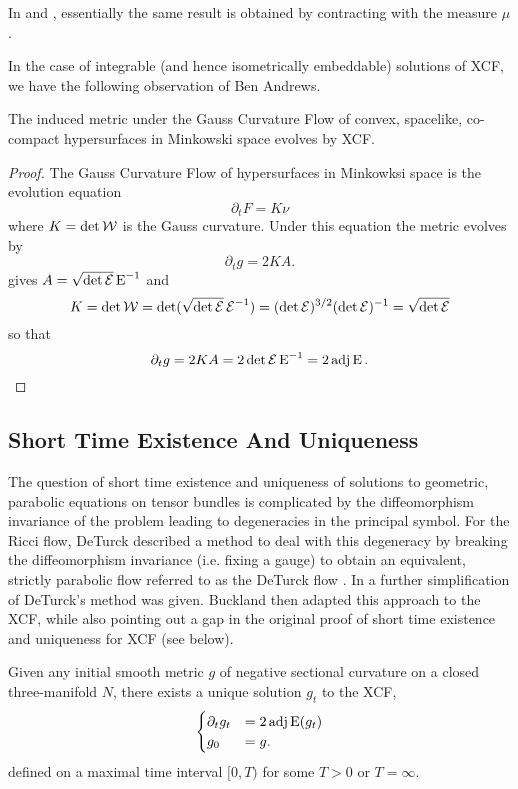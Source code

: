 \documentclass[a4paper,12pt]{amsart}
\begin{document}
\begin{rem}
In \cite[Lemma 3]{MR2055396} and \cite[Equation (3)]{MR2207496}, essentially the same result is obtained by contracting with the measure \(\mu\).
\end{rem}

In the case of integrable (and hence isometrically embeddable) solutions of XCF, we have the following observation of Ben Andrews.

\begin{lemma}[{\cite[Section 12]{MR3344442}}]
\label{lem:xcf_gcf}
The induced metric under the Gauss Curvature Flow of convex, spacelike, co-compact hypersurfaces in Minkowski space evolves by XCF.
\end{lemma}

\begin{proof}
The Gauss Curvature Flow of hypersurfaces in Minkowksi space is the evolution equation
\[
\partial_t F = K\nu
\]
where \(K = \det \operatorname{\mathcal{W}}\) is the Gauss curvature. Under this equation the metric evolves by
\[
\partial_t g = 2KA.
\]
 gives \(A = \sqrt{\det \operatorname{\mathcal{E}}} \operatorname{E}^{-1}\) and
\[
K = \det \operatorname{\mathcal{W}} = \det (\sqrt{\det \operatorname{\mathcal{E}}} \operatorname{\mathcal{E}}^{-1}) = (\det \operatorname{\mathcal{E}})^{3/2} (\det \operatorname{\mathcal{E}})^{-1} = \sqrt{\det \operatorname{\mathcal{E}}}
\]
so that
\[
\partial_t g = 2KA = 2 \det \operatorname{\mathcal{E}} \operatorname{E}^{-1} = 2 \operatorname{adj} \operatorname{E}.
\]
\end{proof}

\subsection{Short Time Existence And Uniqueness}
\label{subsec:xcf_existence_uniqueness}

The question of short time existence and uniqueness of solutions to geometric, parabolic equations on tensor bundles is complicated by the diffeomorphism invariance of the problem leading to degeneracies in the principal symbol. For the Ricci flow, DeTurck described a method to deal with this degeneracy by breaking the diffeomorphism invariance (i.e. fixing a gauge) to obtain an equivalent, strictly parabolic flow referred to as the DeTurck flow \cite{MR697987}. In \cite[Section 6]{MR1375255} a further simplification of DeTurck's method was given. Buckland then adapted this approach to the XCF, while also pointing out a gap in the original proof of short time existence and uniqueness for XCF \cite{MR2207496} (see  below).

\begin{thm}
\label{thm:xcf_existence_uniqueness}
Given any initial smooth metric \(g\) of negative sectional curvature on a closed three-manifold \(N\), there exists a unique solution \(g_t\) to the XCF,
\[
\begin{cases}
\partial_t g_t &= 2\operatorname{adj}\operatorname{E}(g_t) \\
g_0 &= g.
\end{cases}
\]
defined on a maximal time interval \([0, T)\) for some \(T > 0\) or \(T = \infty\).
\end{thm}
\end{document}
